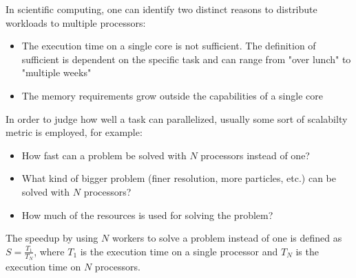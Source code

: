 \documentclass[\main/main.tex]{subfiles}
\begin{document}
In scientific computing, one can identify two distinct reasons to distribute workloads to multiple processors:
\begin{itemize}
    \item The execution time on a single core is not sufficient. The definition of sufficient is dependent on the specific task and can range from "over lunch" to "multiple weeks"
    \item The memory requirements grow outside the capabilities of a single core
\end{itemize}
In order to judge how well a task can parallelized, usually some sort of scalabilty metric is employed, for example:
\begin{itemize}
    \item How fast can a problem be solved with \(N\) processors instead of one?
    \item What kind of bigger problem (finer resolution, more particles, etc.) can be solved with \(N\) processors?
    \item How much of the resources is used for solving the problem?
\end{itemize}
The speedup by using \(N\) workers to solve a problem instead of one is defined as \(S = \frac{T_1}{T_N}\), where \(T_1\) is the execution time on a single processor and \(T_N\) is the execution time on \(N\) processors.
\end{document}
